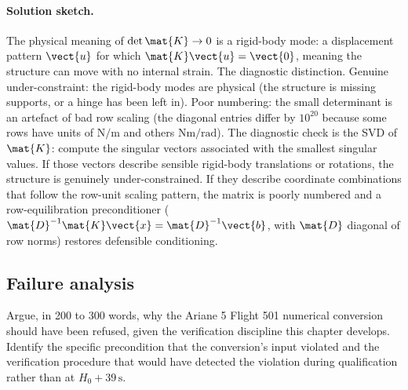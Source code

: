\paragraph{Solution sketch.}
The physical meaning of $\det \mat{K} \to 0$ is a rigid-body mode:
a displacement pattern $\vect{u}$ for which $\mat{K}\vect{u} =
\vect{0}$, meaning the structure can move with no internal strain.
The diagnostic distinction. Genuine under-constraint: the
rigid-body modes are physical (the structure is missing supports,
or a hinge has been left in). Poor numbering: the small determinant
is an artefact of bad row scaling (the diagonal entries differ by
$10^{20}$ because some rows have units of $\si{\newton\per\meter}$
and others $\si{\newton\meter\per\radian}$). The diagnostic check
is the SVD of $\mat{K}$: compute the singular vectors associated
with the smallest singular values. If those vectors describe
sensible rigid-body translations or rotations, the structure is
genuinely under-constrained. If they describe coordinate
combinations that follow the row-unit scaling pattern, the matrix
is poorly numbered and a row-equilibration preconditioner
($\mat{D}^{-1}\mat{K}\vect{x} = \mat{D}^{-1}\vect{b}$, with
$\mat{D}$ diagonal of row norms) restores defensible conditioning.

\subsection*{Failure analysis}

\begin{exercise}
Argue, in 200 to 300 words, why the Ariane 5 Flight 501 numerical
conversion should have been refused, given the verification
discipline this chapter develops. Identify the specific
precondition that the conversion's input violated and the
verification procedure that would have detected the violation
during qualification rather than at $H_{0} + 39 \,\si{\second}$.
\end{exercise}

